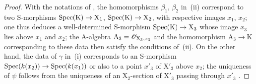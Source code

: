 \begin{proof}
With the notations of , the homomorphisms $\beta_1$, $\beta_2$ in~(ii) correspond to two S-morphisms $\operatorname{Spec}(\mathrm{K})\to\mathrm{X}_1$, $\operatorname{Spec}(\mathrm{K})\to\mathrm{X}_2$, with respective images $x_1$, $x_2$;
one thus deduces a well-determined S-morphism $\operatorname{Spec}(\mathrm{K})\to\mathrm{X}_3$  whose image $x_3$ lies above $x_1$ and $x_2$;
the A-algebra $\mathrm{A}_3=\mathscr{O}_{\mathrm{X}_3,x_3}$ and the homomorphism $\mathrm{A}_3\to\mathrm{K}$ corresponding to these data then satisfy the conditions of~(ii).
On the other hand, the data of $\gamma$ in~(i) corresponds to an S-morphism $\operatorname{Spec}(k(x_2))\to\operatorname{Spec}(k(x_1))$ or also to a point $x'_3$ of $\mathrm{X}'_3$ above $x_2$;
the uniqueness of $\psi$ follows from the uniqueness of an $\mathrm{X}_2$-section of $\mathrm{X}'_3$ passing through $x'_3$ .
\end{proof}

